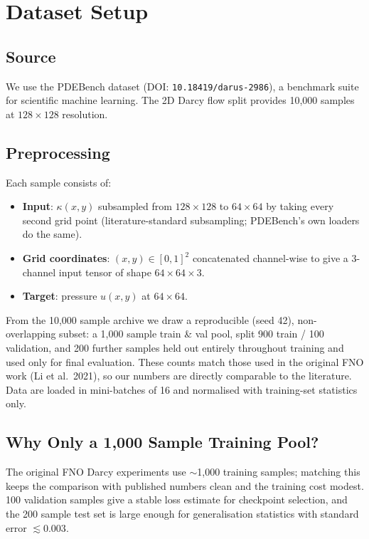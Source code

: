 \documentclass[11pt,a4paper]{article}
\begin{document}
\section{Dataset Setup}

\subsection{Source}
We use the PDEBench dataset \cite{takamoto2022pdebench} (DOI: \texttt{10.18419/darus-2986}), a benchmark suite for scientific machine learning. The 2D Darcy flow split provides 10,000 samples at $128\times128$ resolution.

\subsection{Preprocessing}
Each sample consists of:
\begin{itemize}[nosep]
  \item \textbf{Input}: $\kappa(x,y)$ subsampled from $128\times128$ to $64\times64$ by taking every second grid point (literature-standard subsampling; PDEBench's own loaders do the same).
  \item \textbf{Grid coordinates}: $(x,y)\in[0,1]^2$ concatenated channel-wise to give a 3-channel input tensor of shape $64\times64\times3$.
  \item \textbf{Target}: pressure $u(x,y)$ at $64\times64$.
\end{itemize}

From the 10,000 sample archive we draw a reproducible (seed 42), non-overlapping subset: a 1,000 sample train \& val pool, split 900 train / 100 validation, and 200 further samples held out entirely throughout training and used only for final evaluation. These counts match those used in the original FNO work (Li et al.\ 2021), so our numbers are directly comparable to the literature. Data are loaded in mini-batches of 16 and normalised with training-set statistics only.

\subsection{Why Only a 1,000 Sample Training Pool?}
The original FNO Darcy experiments use $\sim$1,000 training samples; matching this keeps the comparison with published numbers clean and the training cost modest. 100 validation samples give a stable loss estimate for checkpoint selection, and the 200 sample test set is large enough for generalisation statistics with standard error $\lesssim 0.003$.
\end{document}
